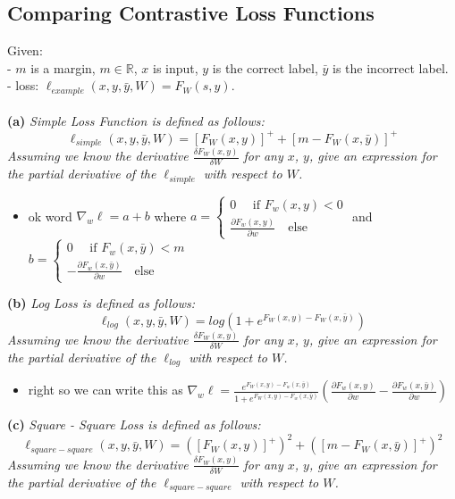 \documentclass{article}
\begin{document}
\subsection{Comparing Contrastive Loss Functions}
Given: \\
- $m$ is a margin, $m \in \mathbb{R}$, $x$ is input, $y$ is the correct label, $\bar{y}$ is the incorrect label. \\
- loss: $\ell_{example}(x, y, \bar{y}, W) = F_W(s, y)$. \\ \\
\textbf{(a)}
\textit{Simple Loss Function is defined as follows: }
\[ \ell_{simple}(x, y, \bar{y}, W) = [F_W(x, y)]^{+} + [m - F_W(x, \bar{y})]^{+} \]
\textit{Assuming we know the derivative $\frac{\delta F_W(x, y)}{\delta W}$ for any $x$, $y$, give an expression for the partial derivative of the $\ell_{simple}$ with respect to $W$.}
\begin{itemize}
    \color{red}
    \item ok word $\nabla_{w}\ell = a + b$ where $a = \begin{cases}
        0 \quad \text{ if } F_{w}(x,y)<0\\
        \frac{\partial F_w(x,y)}{\partial w} \quad \text{else}
    \end{cases}$ and  $b = \begin{cases}
        0 \quad \text{ if } F_{w}(x,\bar{y})<m\\
        -\frac{\partial F_w(x,\bar{y})}{\partial w} \quad \text{else}
    \end{cases}$
\end{itemize}
\textbf{(b)}
\textit{Log Loss is defined as follows: }
\[ \ell_{log}(x, y, \bar{y}, W) = log(1 + e^{F_W(x, y) - F_W(x, \bar{y})}) \]
\textit{Assuming we know the derivative $\frac{\delta F_W(x, y)}{\delta W}$ for any $x$, $y$, give an expression for the partial derivative of the $\ell_{log}$ with respect to $W$.}
\begin{itemize}
    \color{red}
    \item right so we can write this as $\nabla_w{\ell} = \frac{e^{F_W(x,y)-F_{w}(x,\bar{y})}}{1+e^{F_W(x,y)-F_{w}(x,\bar{y})}}(\frac{\partial F_w(x,y)}{\partial w} -\frac{\partial F_w(x,\bar{y})}{\partial w}) $
\end{itemize}
\textbf{(c)}
\textit{Square - Square Loss is defined as follows: }
\[ \ell_{square-square}(x, y, \bar{y}, W) = ([F_W(x, y)]^{+})^{2} + ([m - F_W(x, \bar{y})]^{+})^{2} \]
\textit{Assuming we know the derivative $\frac{\delta F_W(x, y)}{\delta W}$ for any $x$, $y$, give an expression for the partial derivative of the $\ell_{square-square}$ with respect to $W$.}
\end{document}
